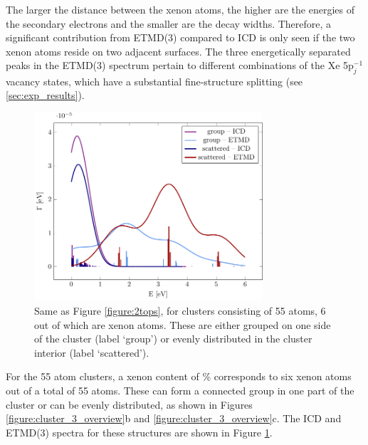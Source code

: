 The larger the distance between the xenon atoms, the higher are the energies
of the secondary electrons and the smaller are the decay widths. 
Therefore, a
significant contribution from ETMD(3) compared to ICD is only
seen if the two xenon atoms reside on two adjacent
surfaces. 
The three energetically separated peaks in the ETMD(3) spectrum pertain to different combinations of the Xe 5p$_j^{-1}$ vacancy states, which have a substantial fine-structure splitting (see \ref{sec:exp_results}).
%

\begin{figure}[ht]
 \centering
 \includegraphics[width=8.5cm]{pics/ar_3_6in.pdf}
 \caption{Same as Figure \protect\ref{figure:2tops}, for clusters consisting of
          55 atoms, 6 out of which are xenon atoms. These are either grouped
          on one side of the cluster (label `group') or evenly distributed
          in the cluster interior (label `scattered').}
 \label{figure:ar_3_6in}
\end{figure}
%
For the 55 atom clusters, a xenon content of \unit[10--12]{\%}
corresponds to six xenon atoms out of a total of 55 atoms. These can form a connected 
group in one part of the cluster or can be evenly distributed,
as shown in Figures \ref{figure:cluster_3_overview}b and \ref{figure:cluster_3_overview}c. The
ICD and ETMD(3) spectra for these structures are shown in Figure \ref{figure:ar_3_6in}.

